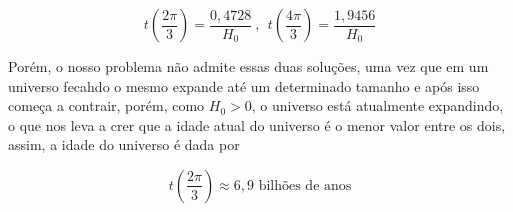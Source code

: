 \documentclass[11pt]{article}
\begin{document}
\begin{pproblem}
\begin{pssolution*}{}{}
\begin{alternativas}
        \[t\left(\frac{2\pi}{3}\right) = \frac{0,4728}{H_0} \ , \ \ t\left(\frac{4\pi}{3}\right) = \frac{1,9456}{H_0}\]

        Porém, o nosso problema não admite essas duas soluções, uma vez que em um universo fecahdo o mesmo expande até um determinado tamanho e após isso começa a contrair, porém, como \(H_0>0\), o universo está atualmente expandindo, o que nos leva a crer que a idade atual do universo é o menor valor entre os dois, assim, a idade do universo é dada por 

        \[\boxed{t\left(\frac{2\pi}{3}\right)\approx 6,9 \text{ bilhões de anos}}\]
    \end{alternativas}
\end{pssolution*}
\end{pproblem}
\end{document}
